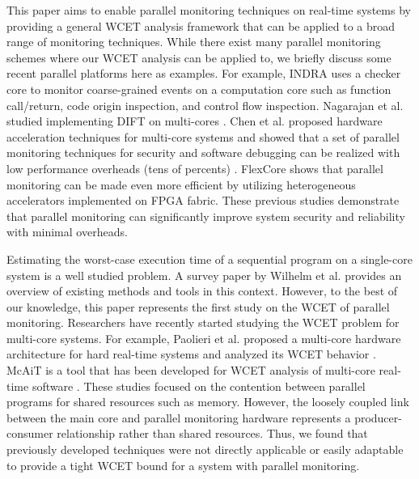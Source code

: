 
This paper aims to enable parallel monitoring techniques on real-time systems
by providing a general WCET analysis framework that can be applied to a broad
range of monitoring techniques. While there exist many parallel monitoring
schemes where our WCET analysis can be applied to, we briefly discuss some
recent parallel platforms here as examples.  For example, INDRA
\cite{indra-isca06} uses a checker core to monitor coarse-grained events on a
computation core such as function call/return, code origin inspection, and
control flow inspection. Nagarajan et al.  studied implementing DIFT on
multi-cores \cite{nagarajan08-dift}.  Chen et al. proposed hardware
acceleration techniques for multi-core systems and showed that a set of
parallel monitoring techniques for security and software debugging can be
realized with low performance overheads (tens of percents) \cite{chen08-lba}.
FlexCore \cite{flexcore-micro10} shows that parallel monitoring can be made
even more efficient by utilizing heterogeneous accelerators implemented on FPGA
fabric.  These previous studies demonstrate that parallel monitoring can
significantly improve system security and reliability with minimal overheads.

Estimating the worst-case execution time of a sequential program on a
single-core system is a well studied problem. A survey paper by Wilhelm et al.
\cite{wcetsurvey-tecs08} provides an overview of existing methods and tools in
this context.  However, to the best of our knowledge, this paper represents the
first study on the WCET of parallel monitoring.  Researchers have recently
started studying the WCET problem for multi-core systems.  For example,
Paolieri et al. proposed a multi-core hardware architecture for hard real-time
systems and analyzed its WCET behavior \cite{paolieri-isca09}.  McAiT is a tool
that has been developed for WCET analysis of multi-core real-time software
\cite{mcait-rtss10}.  These studies focused on the contention between parallel
programs for shared resources such as memory.  However, the loosely coupled
link between the main core and parallel monitoring hardware represents a
producer-consumer relationship rather than shared resources. Thus, we found
that previously developed techniques were not directly applicable or easily
adaptable to provide a tight WCET bound for a system with parallel monitoring.


